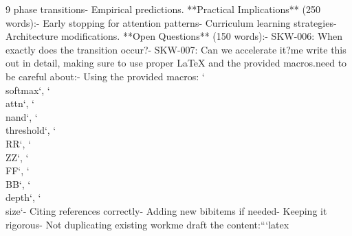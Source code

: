 \documentclass[11pt]{article}
\theoremstyle{definition}
\newcommand{\RR}{\mathbb{R}}
\newcommand{\ZZ}{\mathbb{Z}}
\newcommand{\FF}{\mathbb{F}}
\newcommand{\BB}{\mathbb{B}}
\newcommand{\softmax}{\operatorname{softmax}}
\newcommand{\attn}{\operatorname{Attn}}
\newcommand{\nand}{\mathbin{\uparrow}}
\newcommand{\threshold}{\operatorname{T}}
\newcommand{\depth}{\operatorname{depth}}
\newcommand{\size}{\operatorname{size}}
\begin{document}
\begin{thebibliography}{9}
phase transitions\n   - Empirical predictions\n{}. **Practical Implications** (250 words):\n   - Early stopping for attention patterns\n   - Curriculum learning strategies\n   - Architecture modifications\n{}. **Open Questions** (150 words):\n   - SKW-006: When exactly does the transition occur?\n   - SKW-007: Can we accelerate it?\n\nLet me write this out in detail, making sure to use proper LaTeX and the provided macros.\n\nI need to be careful about:\n- Using the provided macros: `\\softmax`, `\\attn`, `\\nand`, `\\threshold`, `\\RR`, `\\ZZ`, `\\FF`, `\\BB`, `\\depth`, `\\size`\n- Citing references correctly\n- Adding new bibitems if needed\n- Keeping it rigorous\n- Not duplicating existing work\n\nLet me draft the content:\n\n```latex\n%
\end{thebibliography}
\end{document}
